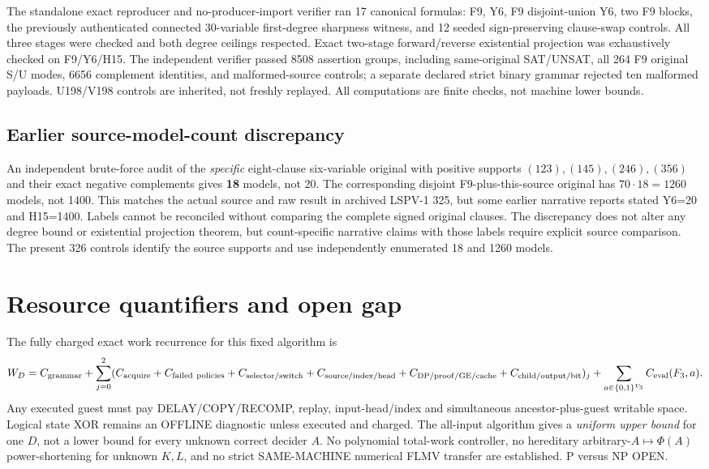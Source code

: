 \documentclass[11pt]{article}
\begin{document}
The standalone exact reproducer and no-producer-import verifier ran 17 canonical formulas: F9, Y6, F9 disjoint-union Y6, two F9 blocks, the previously authenticated connected 30-variable first-degree sharpness witness, and 12 seeded sign-preserving clause-swap controls. All three stages were checked and both degree ceilings respected. Exact two-stage forward/reverse existential projection was exhaustively checked on F9/Y6/H15. The independent verifier passed 8508 assertion groups, including same-original SAT/UNSAT, all 264 F9 original S/U modes, 6656 complement identities, and malformed-source controls; a separate declared strict binary grammar rejected ten malformed payloads. U198/V198 controls are inherited, not freshly replayed. All computations are finite checks, not machine lower bounds.
\subsection*{Earlier source-model-count discrepancy}
An independent brute-force audit of the \emph{specific} eight-clause six-variable original with positive supports $(123),(145),(246),(356)$ and their exact negative complements gives \textbf{18} models, not 20. The corresponding disjoint F9-plus-this-source original has $70\cdot18=1260$ models, not 1400. This matches the actual source and raw result in archived LSPV-1 325, but some earlier narrative reports stated Y6=20 and H15=1400. Labels cannot be reconciled without comparing the complete signed original clauses. The discrepancy does not alter any degree bound or existential projection theorem, but count-specific narrative claims with those labels require explicit source comparison. The present 326 controls identify the source supports and use independently enumerated 18 and 1260 models.

\section{Resource quantifiers and open gap}
The fully charged exact work recurrence for this fixed algorithm is
\[
W_D=C_{\rm grammar}+\sum_{j=0}^{2}
(C_{\rm acquire}+C_{\rm failed\ policies}+C_{\rm selector/switch}
+C_{\rm source/index/head}+C_{\rm DP/proof/GE/cache}
+C_{\rm child/output/bit})_j
+\sum_{a\in\{0,1\}^{V_3}}C_{\rm eval}(F_3,a).
\]
Any executed guest must pay DELAY/COPY/RECOMP, replay, input-head/index and simultaneous ancestor-plus-guest writable space. Logical state XOR remains an OFFLINE diagnostic unless executed and charged. The all-input algorithm gives a \emph{uniform upper bound} for one $D$, not a lower bound for every unknown correct decider $A$. No polynomial total-work controller, no hereditary arbitrary-$A\mapsto\Phi(A)$ power-shortening for unknown $K,L$, and no strict SAME-MACHINE numerical FLMV transfer are established. P versus NP OPEN.
\end{document}
